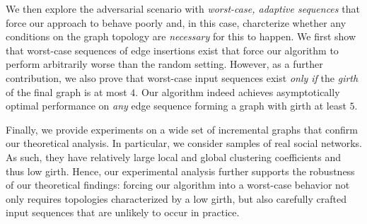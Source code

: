 We then explore the adversarial scenario with  \textit{worst-case, adaptive sequences} that force our approach to behave poorly and, in this case, charcterize  whether any conditions on the graph topology are \textit{necessary} for this to happen. 
We first show that  worst-case sequences of edge insertions exist that force our algorithm to perform arbitrarily worse than the random setting.  However, as a further contribution, we also prove that worst-case input sequences exist \textit{only if} the \textit{girth}  of the final graph is at most $4$.
Our algorithm indeed achieves asymptotically optimal performance on \textit{any} edge sequence forming a  graph with girth at least $5$.

Finally, we provide experiments on a wide set of incremental graphs that confirm our theoretical analysis. In particular, we consider  samples of real social networks. As such, they have relatively large local and global clustering coefficients and thus low girth. Hence, our experimental analysis further supports the robustness of our theoretical findings: forcing our algorithm into a worst-case behavior not only requires topologies characterized by a low girth, but also carefully crafted input sequences that are unlikely to occur in practice.  
\fi